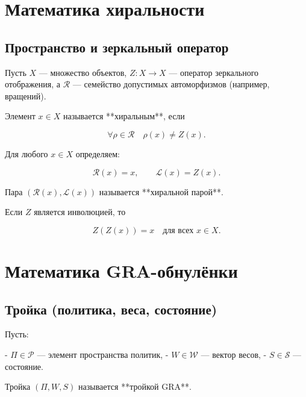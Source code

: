 \documentclass[11pt,a4paper]{article}
\begin{document}
\section{Математика хиральности}

\subsection{Пространство и зеркальный оператор}

\begin{definition}[Хиральность]
Пусть \(X\) — множество объектов, \(Z : X \to X\) — оператор зеркального отображения,
а \(\mathcal{R}\) — семейство допустимых автоморфизмов (например, вращений).

Элемент \(x \in X\) называется **хиральным**, если

\[
\forall \rho \in \mathcal{R} \quad \rho(x) \neq Z(x).
\tag{1}
\]
\end{definition}

\begin{definition}
Для любого \(x \in X\) определяем:

\[
\mathcal{R}(x) = x, \qquad \mathcal{L}(x) = Z(x).
\tag{2}
\]

Пара \((\mathcal{R}(x), \mathcal{L}(x))\) называется **хиральной парой**.
\end{definition}

\begin{lemma}
Если \(Z\) является инволюцией, то

\[
Z(Z(x)) = x \quad \text{для всех } x \in X.
\tag{3}
\]
\end{lemma}

\section{Математика GRA-обнулёнки}

\subsection{Тройка (политика, веса, состояние)}

\begin{definition}
Пусть:

- \(\Pi \in \mathcal{P}\) — элемент пространства политик,
- \(W \in \mathcal{W}\) — вектор весов,
- \(S \in \mathcal{S}\) — состояние.

Тройка \((\Pi, W, S)\) называется **тройкой GRA**.
\end{definition}
\end{document}
